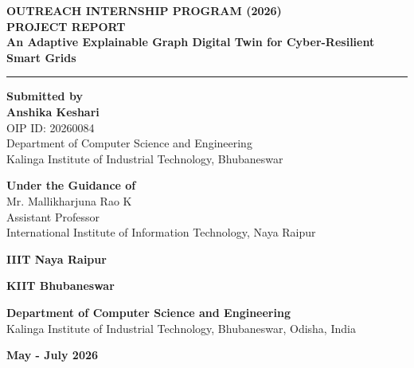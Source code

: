 \documentclass[12pt,a4paper]{report}
\begin{document}
\begin{titlepage}
\thispagestyle{empty}
\begin{center}

{\Large\bfseries\color{blue} OUTREACH INTERNSHIP PROGRAM (2026)}\\[0.2cm]
{\large \textbf{PROJECT REPORT}}\\[0.4cm]

{\Huge\bfseries
An Adaptive Explainable Graph Digital Twin for Cyber-Resilient Smart Grids\\[0.2cm]
}

\rule{0.8\textwidth}{0.5pt}
\vspace{0.3cm}

{\large\textbf{Submitted by}}\\[0.2cm]
{\Large\bfseries
Anshika Keshari
}\\[0.1cm]
OIP ID: 20260084\\
Department of Computer Science and Engineering\\
Kalinga Institute of Industrial Technology, Bhubaneswar

\vspace{0.4cm}

{\large\textbf{Under the Guidance of}}\\[0.2cm]
{\large
Mr. Mallikharjuna Rao K\\
Assistant Professor\\
International Institute of Information Technology, Naya Raipur
}

\vspace{1.1cm}

\begin{minipage}{0.45\textwidth}
\centering
\vspace{1.5cm}
\textbf{IIIT Naya Raipur}
\end{minipage}
\hfill
\begin{minipage}{0.45\textwidth}
\centering
\vspace{1.5cm}
\textbf{KIIT Bhubaneswar}
\end{minipage}

\vspace{0.8cm}
\textbf{Department of Computer Science and Engineering}\\
{\small Kalinga Institute of Industrial Technology, Bhubaneswar, Odisha, India}

\vspace{0.4cm}
{\large\bfseries May - July 2026}

\end{center}
\end{titlepage}
\end{document}

